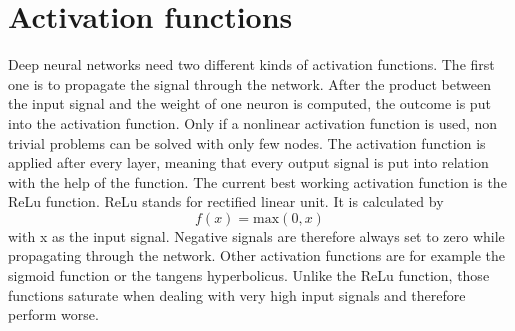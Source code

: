 \section{Activation functions}
Deep neural networks need two different kinds of activation functions. The first one is to propagate the signal through the network. After the product between the input signal and the weight of one neuron is computed, the outcome is put into the activation function. Only if a nonlinear activation function is used, non trivial problems can be solved with only few nodes. The activation function is applied after every layer, meaning that every output signal is put into relation with the help of the function. The current best working activation function is the ReLu function. ReLu stands for rectified linear unit. It is calculated by
\begin{equation}
f(x) = \mathrm{max} (0,x)
\end{equation}
with x as the input signal. Negative signals are therefore always set to zero while propagating through the network. Other activation functions are for example the sigmoid function or the tangens hyperbolicus. Unlike the ReLu function, those functions saturate when dealing with very high input signals and therefore perform worse.

